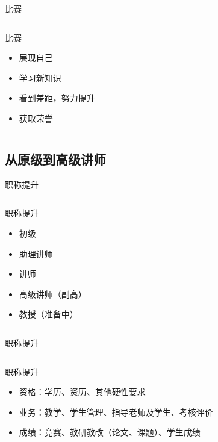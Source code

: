 \documentclass[14pt]{beamer}
\begin{document}
\begin{frame}{比赛}
\begin{columns}
	\begin{block}{\centering 比赛}
		\begin{itemize}[<+->]
			\item 展现自己
			\item 学习新知识
			\item 看到差距，努力提升
			\item 获取荣誉
		\end{itemize}
	\end{block}
\end{columns}
\end{frame}

\subsection{从原级到高级讲师}

\begin{frame}{职称提升}
\begin{columns}
	\begin{block}{\centering 职称提升}
		\begin{itemize}[<+->]
			\item 初级
			\item 助理讲师
			\item 讲师
			\item 高级讲师（副高）
			\item 教授（准备中）
		\end{itemize}
	\end{block}
\end{columns}
\end{frame}

\begin{frame}{职称提升}
\begin{columns}
	\begin{block}{\centering 职称提升}
		\begin{itemize}[<+->]
			\item 资格：学历、资历、其他硬性要求
			\item 业务：教学、学生管理、指导老师及学生、考核评价
			\item 成绩：竞赛、教研教改（论文、课题）、学生成绩
		\end{itemize}
	\end{block}
\end{columns}
\end{frame}
\end{document}
